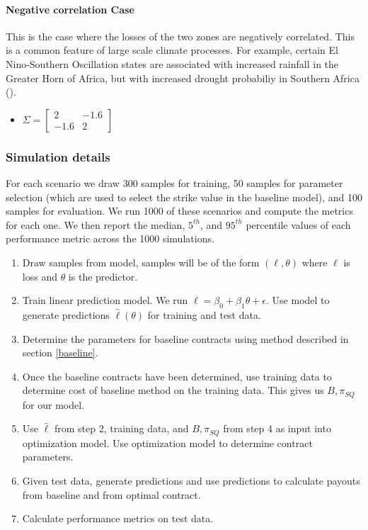 \documentclass[11pt]{article}
\begin{document}
      \paragraph*{Negative correlation Case}
        This is the case where the losses of the two zones are negatively correlated. This is a common feature of large scale climate processes. For example, certain El Nino-Southern Oscillation states are associated with increased rainfall in the Greater Horn of Africa, but with increased drought probabiliy in Southern Africa (\cite{barrett2007poverty}). 
        \begin{itemize}
            \item $\Sigma = \begin{bmatrix}
                2 & -1.6 \\
                -1.6 & 2 
                \end{bmatrix} $
        \end{itemize}

    \subsubsection{Simulation details}
      For each scenario we draw 300 samples for training, 50 samples for parameter selection (which are used to select the strike value in the baseline model), and 100 samples for evaluation. We run 1000 of these scenarios and compute the metrics for each one. We then report the median, $5^{th}$, and $95^{th}$ percentile values of each performance metric across the 1000 simulations. 
      \begin{enumerate}
        \item Draw samples from model, samples will be of the form $(\ell,\theta)$ where $\ell$ is loss and $\theta$ is the predictor. 
        \item Train linear prediction model. We run $\ell = \beta_0 + \beta_1\theta +\epsilon$. Use model to generate predictions $\hat{\ell}(\theta)$ for training and test data. 
        \item Determine the parameters for baseline contracts using method described in section \ref{baseline}. 
        \item Once the baseline contracts have been determined, use training data to determine cost of baseline method on the training data. This gives us $B,\pi_{SQ}$ for our model. 
        \item Use $\hat{\ell}$ from step 2, training data, and $B, \pi_{SQ}$ from step 4 as input into optimization model. Use optimization  model to determine contract parameters. 
        \item Given test data, generate predictions and use predictions to calculate payouts from baseline and from optimal contract. 
        \item Calculate performance metrics on test data. 
      \end{enumerate}
\end{document}
